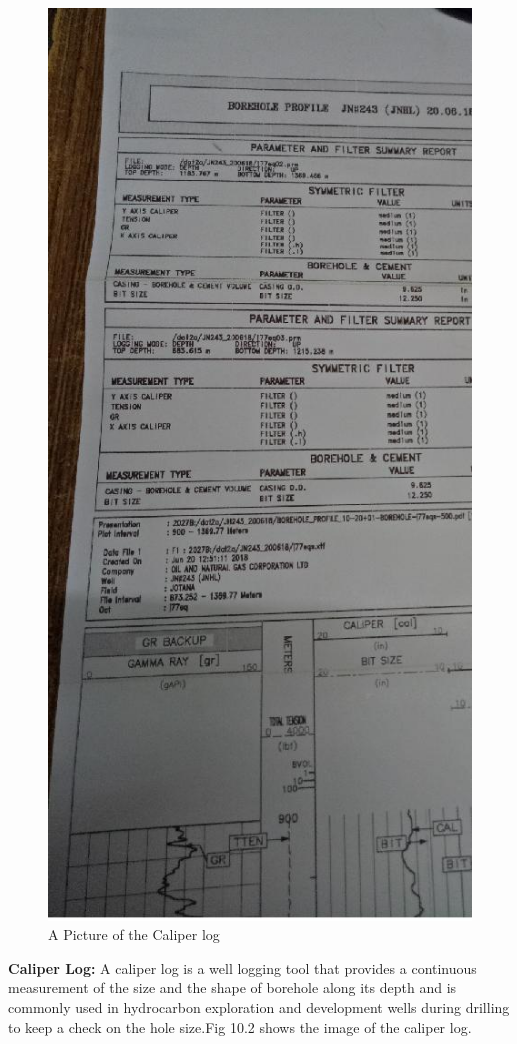\begin{enumerate}
\begin{figure}[H]
\includegraphics[scale=0.3]{images/Log}
\centering 
\caption{A Picture of the Caliper log}
\end{figure}

\textbf{Caliper Log:} A caliper log is a well logging tool that provides a
continuous measurement of the size and the shape of borehole along
its depth and is commonly used in hydrocarbon exploration and
development wells during drilling to keep a check on the hole size.Fig 10.2 shows the image of the caliper log.


\end{enumerate}

